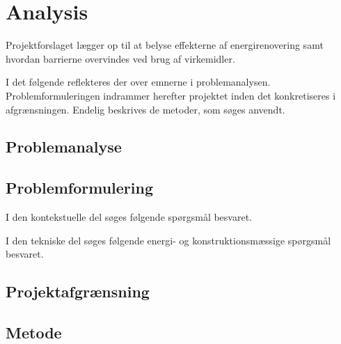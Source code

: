 \chapter{Analysis}

Projektforslaget lægger op til at belyse effekterne af energirenovering samt hvordan barrierne overvindes ved brug af virkemidler. 

I det følgende reflekteres der over emnerne i problemanalysen. Problemformuleringen indrammer herefter projektet inden det konkretiseres i afgrænsningen. Endelig beskrives de metoder, som søges anvendt. 

\section{Problemanalyse}

\section{Problemformulering}

I den kontekstuelle del søges følgende spørgsmål besvaret.

I den tekniske del søges følgende energi- og konstruktionsmæssige spørgsmål besvaret.

\section{Projektafgrænsning}

\section{Metode}